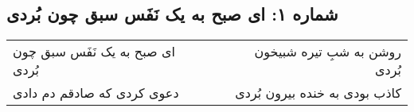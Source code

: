 \begin{center}
\section*{شماره ۱: ای صبح به یک نَفَس سبق چون بُردی}
\label{sec:001}
\begin{longtable}{l p{0.5cm} r}
ای صبح به یک نَفَس سبق چون بُردی
&&
روشن به شبِ تیره شبیخون بُردی
\\
دعوی کردی که صادقم دم دادی
&&
کاذب بودی به خنده بیرون بُردی
\\
\end{longtable}
\end{center}
